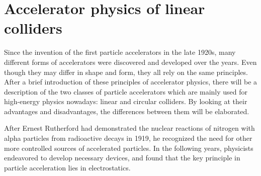 \chapter{Accelerator physics of linear colliders}
\label{LinearColliderPhysics}

\begin{chapterabstract}
Since the invention of the first particle accelerators in the late 1920s, many different forms of accelerators were discovered and developed over the years. 
Even though they may differ in shape and form, they all rely on the same principles. 
After a brief introduction of these principles of accelerator physics, there will be a description of the two classes of particle accelerators which are mainly used for high-energy physics nowadays: linear and circular colliders. 
By looking at their advantages and disadvantages, the differences between them will be elaborated.
\end{chapterabstract}
\newline

After Ernest Rutherford had demonstrated the nuclear reactions of nitrogen with alpha particles from radioactive decays in 1919, he recognized the need for other more controlled sources of accelerated particles.
In the following years, physicists endeavored to develop necessary devices, and found that the key principle in particle acceleration lies in electrostatics.~\cite[p. 3f]{Livingston}

